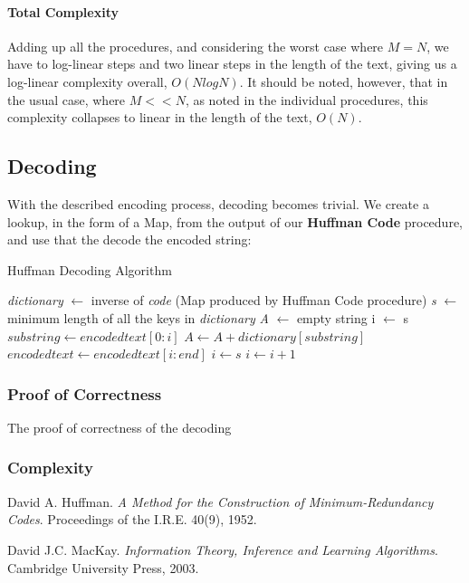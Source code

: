 \documentclass[paper=a4, fontsize=10pt]{article} %
\numberwithin{equation}{section} %
\numberwithin{figure}{section} %
\numberwithin{table}{section} %
\begin{document}
\paragraph{Total Complexity}
Adding up all the procedures, and considering the worst case where $M = N$, we have to log-linear steps and two linear steps in the length of the text, giving us a log-linear complexity overall, $O(N log N)$. It should be noted, however, that in the usual case, where $M << N$, as noted in the individual procedures, this complexity collapses to linear in the length of the text, $O(N)$.

\subsection{Decoding}

With the described encoding process, decoding becomes trivial. We create a lookup, in the form of a Map, from the output of our \textbf{Huffman Code} procedure, and use that the decode the encoded string:

\pagebreak

\begin{algorithm}[h]
\caption{Huffman Decoding Algorithm}\label{alg:dec}
\begin{algorithmic}[1]
\State \textit{dictionary} $\gets$ inverse of \textit{code} (Map produced by Huffman Code procedure)
\State \textit{s} $\gets$ minimum length of all the keys in \textit{dictionary}
\State \textit{A} $\gets$ empty string
\State i $\gets$ s
\State $substring \gets encodedtext[0:i]$
\State $A \gets A + dictionary[substring] $
\State $encodedtext \gets encodedtext[i : end]$
\State $i \gets s$
\Else
\State $i \gets i + 1$
\EndIf
\EndWhile
{}
\EndProcedure
\end{algorithmic}
\end{algorithm}

\subsubsection{Proof of Correctness}

The proof of correctness of the decoding

\subsubsection{Complexity}




\pagebreak

\begin{thebibliography}{9}
David A. Huffman.
\textit{A Method for the Construction of Minimum-Redundancy Codes}.
Proceedings of the I.R.E. 40(9), 1952.

David J.C. MacKay.
\textit{Information Theory, Inference and Learning Algorithms}.
Cambridge University Press, 2003.
\end{thebibliography}
\end{document}
